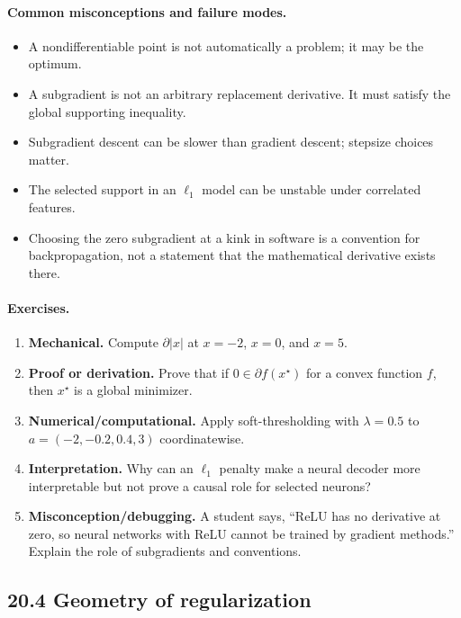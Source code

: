 \paragraph{Common misconceptions and failure modes.}
\begin{itemize}[leftmargin=*]
\item A nondifferentiable point is not automatically a problem; it may be the optimum.
\item A subgradient is not an arbitrary replacement derivative. It must satisfy the global supporting inequality.
\item Subgradient descent can be slower than gradient descent; stepsize choices matter.
\item The selected support in an \(\ell_1\) model can be unstable under correlated features.
\item Choosing the zero subgradient at a kink in software is a convention for backpropagation, not a statement that the mathematical derivative exists there.
\end{itemize}

\paragraph{Exercises.}
\begin{enumerate}[label=\textbf{20.3.\arabic*.}, leftmargin=*]
\item \textbf{Mechanical.} Compute \(\partial |x|\) at \(x=-2\), \(x=0\), and \(x=5\).
\item \textbf{Proof or derivation.} Prove that if \(0\in\partial f(x^\star)\) for a convex function \(f\), then \(x^\star\) is a global minimizer.
\item \textbf{Numerical/computational.} Apply soft-thresholding with \(\lambda=0.5\) to \(a=(-2, -0.2, 0.4, 3)\) coordinatewise.
\item \textbf{Interpretation.} Why can an \(\ell_1\) penalty make a neural decoder more interpretable but not prove a causal role for selected neurons?
\item \textbf{Misconception/debugging.} A student says, ``ReLU has no derivative at zero, so neural networks with ReLU cannot be trained by gradient methods.'' Explain the role of subgradients and conventions.
\end{enumerate}

\subsection{20.4 Geometry of regularization}

